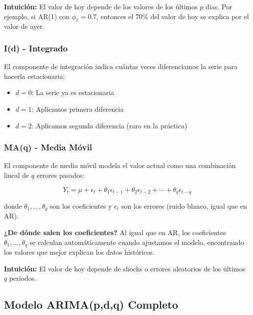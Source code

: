 \documentclass[12pt]{article}
\begin{document}
\vspace{0.5em}

\textbf{Intuición:} El valor de hoy depende de los valores de los últimos $p$ días. Por ejemplo, si AR(1) con $\phi_1 = 0.7$, entonces el 70\% del valor de hoy se explica por el valor de ayer.

\subsubsection{I(d) - Integrado}

El componente de integración indica cuántas veces diferenciamos la serie para hacerla estacionaria:

\begin{itemize}
    \item $d=0$: La serie ya es estacionaria
    \item $d=1$: Aplicamos primera diferencia
    \item $d=2$: Aplicamos segunda diferencia (raro en la práctica)
\end{itemize}

\subsubsection{MA(q) - Media Móvil}

El componente de media móvil modela el valor actual como una combinación lineal de $q$ errores pasados:

\[
Y_t = \mu + \epsilon_t + \theta_1 \epsilon_{t-1} + \theta_2 \epsilon_{t-2} + \cdots + \theta_q \epsilon_{t-q}
\]

donde $\theta_1, \ldots, \theta_q$ son los coeficientes y $\epsilon_t$ son los errores (ruido blanco, igual que en AR).

\vspace{0.5em}

\textbf{¿De dónde salen los coeficientes?} Al igual que en AR, los coeficientes $\theta_1, \ldots, \theta_q$ se calculan automáticamente cuando ajustamos el modelo, encontrando los valores que mejor explican los datos históricos.

\vspace{0.5em}

\textbf{Intuición:} El valor de hoy depende de shocks o errores aleatorios de los últimos $q$ períodos.

\subsection{Modelo ARIMA(p,d,q) Completo}
\end{document}
